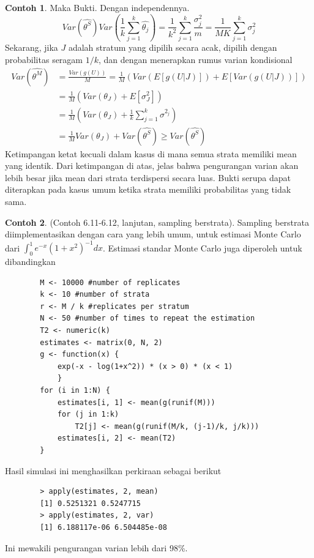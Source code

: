 \documentclass[a4paper,12pt]{article}
\theoremstyle{definition}
\newtheorem{example}{Contoh}[section]
\begin{document}
\begin{example}
    Maka Bukti. Dengan independennya.
    \begin{equation*}
        Var(\widehat{\theta^{S}})Var\left ( \frac{1}{k}\sum_{j=1}^{k}\widehat{\theta_{j}} \right )=\frac{1}{k^{2}}\sum_{j=1}^{k}\frac{\sigma^{2}_{j}}{m}=\frac{1}{MK}\sum_{j=1}^{k}\sigma^{2}_{j}
    \end{equation*}
    Sekarang, jika $J$ adalah stratum yang dipilih secara acak, dipilih dengan probabilitas seragam $1/k$, dan dengan menerapkan rumus varian kondisional
    \begin{equation}
        \begin{split}
            Var(\widehat{\theta^{M}})&=\frac{Var(g(U))}{M}=\frac{1}{M}(Var(E[g(U|J)])+E[Var(g(U|J))])\\
            &=\frac{1}{M}(Var(\theta_{J})+E[\sigma^{2}_{J}])\\
            &=\frac{1}{M}\left ( Var(\theta_{J})+\frac{1}{k}\sum_{j=1}^{k}\sigma^{2_{j}} \right )\\
            &=\frac{1}{M}Var(\theta_{J})+Var(\widehat{\theta^{S}})\geq Var(\widehat{\theta^{S}})
        \end{split}
    \end{equation}
    Ketimpangan ketat kecuali dalam kasus di mana semua strata memiliki mean yang identik. Dari ketimpangan di atas, jelas bahwa pengurangan varian akan lebih besar jika mean dari strata terdispersi secara luas. Bukti serupa dapat diterapkan pada kasus umum ketika strata memiliki probabilitas yang tidak sama.
\end{example}
\begin{example}
    (Contoh 6.11-6.12, lanjutan, sampling berstrata). Sampling berstrata diimplementasikan dengan cara yang lebih umum, untuk estimasi Monte Carlo dari $\int_{0}^{1}e^{-x}(1+x^{2})^{-1}dx$. Estimasi standar Monte Carlo juga diperoleh untuk dibandingkan
    \begin{lstlisting}
        M <- 10000 #number of replicates
        k <- 10 #number of strata
        r <- M / k #replicates per stratum
        N <- 50 #number of times to repeat the estimation
        T2 <- numeric(k)
        estimates <- matrix(0, N, 2)
        g <- function(x) {
            exp(-x - log(1+x^2)) * (x > 0) * (x < 1)
            }
        for (i in 1:N) {
            estimates[i, 1] <- mean(g(runif(M)))
            for (j in 1:k)
                T2[j] <- mean(g(runif(M/k, (j-1)/k, j/k)))
            estimates[i, 2] <- mean(T2)
        }
    \end{lstlisting}
    Hasil simulasi ini menghasilkan perkiraan sebagai berikut
    \begin{lstlisting}
        > apply(estimates, 2, mean)
        [1] 0.5251321 0.5247715
        > apply(estimates, 2, var)
        [1] 6.188117e-06 6.504485e-08
    \end{lstlisting}
    Ini mewakili pengurangan varian lebih dari 98\%.
\end{example}
\end{document}

